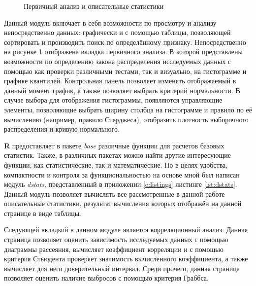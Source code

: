 \begin{figure}[ht]
\caption{Первичный анализ и описательные статистики}
\label{img:mod_basis}
\end{figure}
Данный модуль включает в себя возможности по просмотру и анализу непосредственно данных: графически и с помощью таблицы, позволяющей сортировать и производить поиск по определённому признаку. Непосредственно на рисунке \ref{img:mod_basis} отображена вкладка первичного анализа. В которой представлены возможности по определению закона распределения исследуемых данных с помощью как проверки различными тестами, так и визуально, на гистограмме и графике квантилей. Контрольная панель позволяет изменять отображаемый в данный момент график, а также позволяет выбрать критерий нормальности. В случае выбора для отображения гистограммы, появляются управляющие элементы, позволяющие выбрать ширину столбца на гистограмме и правило по её вычислению (например, правило Стерджеса), отобразить плотность выборочного распределения и кривую нормального.

\textbf{R} предоставляет в пакете \textit{base} различные функции для расчетов базовых статистик. Также, в различных пакетах можно найти другие интересующие функции, как статистические, так и математические. Но в целях удобства, компактности и контроля за функциональностью на основе \cite{Eliseeva1995, Cramer1997} мной был написан модуль \textit{dstats}, представленный в приложении \ref{c:listings} листинге \ref{lst:dstats}. Данный модуль позволяет вычислять все рассмотренные в данной работе описательные статистики, результат вычисления которых отображён на данной странице в виде таблицы.

Следующей вкладкой в данном модуле является корреляционный анализ. Данная страница позволяет оценить зависимость исследуемых данных с помощью диаграммы рассеяния, вычисляет коэффициент корреляции и с помощью критерия Стьюдента проверяет значимость вычисленного коэффициента, а также вычисляет для него доверительный интервал. Среди прочего, данная страница позволяет оценить наличие выбросов с помощью критерия Граббса.

